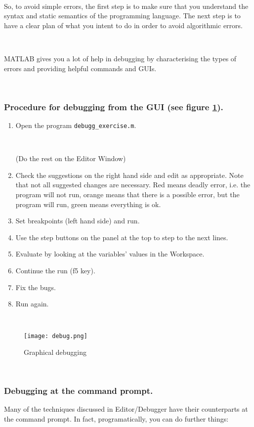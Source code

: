 \documentclass[11pt]{amsart}
\begin{document}
\

So, to avoid simple errors, the first step is to make sure that you understand the syntax and static semantics of the programming language. The next step is to have a clear plan of what you intent to do in order to avoid algorithmic errors. 

\

MATLAB gives you a lot of help in debugging by characterising the types of errors and providing helpful commands and GUIs.

\

\subsubsection{Procedure for debugging from the GUI (see figure \ref{fig_debug}).}

\begin{enumerate}
\item Open the program \verb+debugg_exercise.m+.

\
 
(Do the rest on the Editor Window)
\item Check the suggestions on the right hand side and edit as appropriate. Note that not all suggested changes are necessary. Red means deadly error, i.e. the program will not run, orange means that there is a possible error, but the program will run, green means everything is ok. 
\item  Set breakpoints (left hand side) and run.
\item  Use the step buttons on the panel at the top to step to the next lines.
\item  Evaluate by looking at the variables' values in the Workspace.
\item  Continue the run (f5 key).
\item  Fix the bugs.
\item Run again.
\end{enumerate}

\

\begin{figure}[h]
\centering
\caption{Graphical debugging}
\label{fig_debug}
	 \texttt{[image: debug.png]}
\end{figure}

\

\subsubsection{Debugging at the command prompt.}
Many of the techniques discussed in Editor/Debugger have their counterparts at the command prompt. In fact, programatically, you can do further things: 
\end{document}
